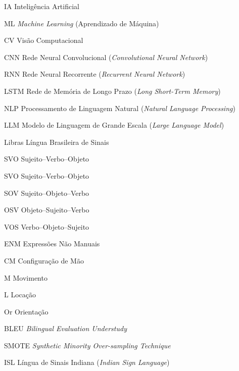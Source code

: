 \documentclass[
    12pt,                %
    openright,           %
    oneside,             %
    a4paper,             %
    english,             %
    brazil               %
]{abntex2}
\begin{document}
\begin{siglas}
    \item[IA]    Inteligência Artificial
    \item[ML]    \textit{Machine Learning} (Aprendizado de Máquina)
    \item[CV]    Visão Computacional
    \item[CNN]   Rede Neural Convolucional (\textit{Convolutional Neural Network})
    \item[RNN]   Rede Neural Recorrente (\textit{Recurrent Neural Network})
    \item[LSTM]  Rede de Memória de Longo Prazo (\textit{Long Short-Term Memory})
    \item[NLP]   Processamento de Linguagem Natural (\textit{Natural Language Processing})
    \item[LLM]   Modelo de Linguagem de Grande Escala (\textit{Large Language Model})
    \item[Libras] Língua Brasileira de Sinais
    \item[SVO]   Sujeito–Verbo–Objeto
    \item[SVO]   Sujeito–Verbo–Objeto
    \item[SOV]   Sujeito–Objeto–Verbo
    \item[OSV]   Objeto–Sujeito–Verbo
    \item[VOS]   Verbo–Objeto–Sujeito
    \item[ENM]   Expressões Não Manuais
    \item[CM]    Configuração de Mão
    \item[M]     Movimento
    \item[L]     Locação
    \item[Or]    Orientação
    \item[BLEU]  \textit{Bilingual Evaluation Understudy}
    \item[SMOTE] \textit{Synthetic Minority Over-sampling Technique}
    \item[ISL]   Língua de Sinais Indiana (\textit{Indian Sign Language})
\end{siglas}
\cleardoublepage

\cleardoublepage

\tableofcontents*
\cleardoublepage
\end{document}

